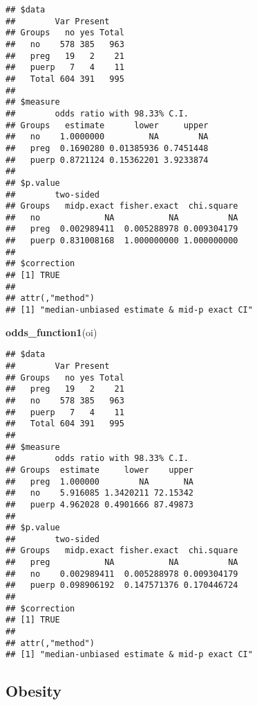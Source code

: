 \documentclass[
]{article}
\newenvironment{Shaded}{\begin{snugshade}}{\end{snugshade}}
\newcommand{\KeywordTok}[1]{\textcolor[rgb]{0.13,0.29,0.53}{\textbf{#1}}}
\newcommand{\NormalTok}[1]{#1}
\newcommand{\OperatorTok}[1]{\textcolor[rgb]{0.81,0.36,0.00}{\textbf{#1}}}
\newcommand{\StringTok}[1]{\textcolor[rgb]{0.31,0.60,0.02}{#1}}
\begin{document}
\begin{verbatim}
## $data
##        Var Present
## Groups   no yes Total
##   no    578 385   963
##   preg   19   2    21
##   puerp   7   4    11
##   Total 604 391   995
## 
## $measure
##        odds ratio with 98.33% C.I.
## Groups   estimate      lower     upper
##   no    1.0000000         NA        NA
##   preg  0.1690280 0.01385936 0.7451448
##   puerp 0.8721124 0.15362201 3.9233874
## 
## $p.value
##        two-sided
## Groups   midp.exact fisher.exact  chi.square
##   no             NA           NA          NA
##   preg  0.002989411  0.005288978 0.009304179
##   puerp 0.831008168  1.000000000 1.000000000
## 
## $correction
## [1] TRUE
## 
## attr(,"method")
## [1] "median-unbiased estimate & mid-p exact CI"
\end{verbatim}

\begin{Shaded}
\begin{Highlighting}[]
\KeywordTok{odds_function1}\NormalTok{(oi)}
\end{Highlighting}
\end{Shaded}

\begin{verbatim}
## $data
##        Var Present
## Groups   no yes Total
##   preg   19   2    21
##   no    578 385   963
##   puerp   7   4    11
##   Total 604 391   995
## 
## $measure
##        odds ratio with 98.33% C.I.
## Groups  estimate     lower    upper
##   preg  1.000000        NA       NA
##   no    5.916085 1.3420211 72.15342
##   puerp 4.962028 0.4901666 87.49873
## 
## $p.value
##        two-sided
## Groups   midp.exact fisher.exact  chi.square
##   preg           NA           NA          NA
##   no    0.002989411  0.005288978 0.009304179
##   puerp 0.098906192  0.147571376 0.170446724
## 
## $correction
## [1] TRUE
## 
## attr(,"method")
## [1] "median-unbiased estimate & mid-p exact CI"
\end{verbatim}

\hypertarget{obesity}{%
\subsection{Obesity}\label{obesity}}

\begin{Shaded}
\end{Shaded}
\end{document}
